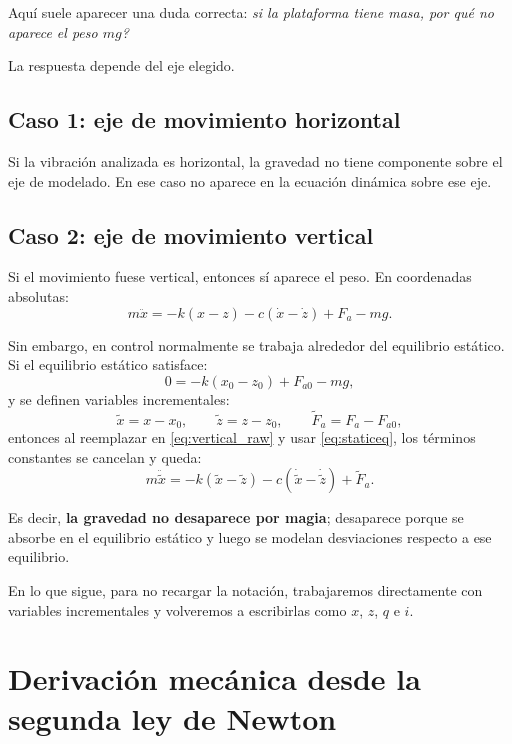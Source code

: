 \documentclass[11pt]{article}
\begin{document}
Aqu\'i suele aparecer una duda correcta: \textit{si la plataforma tiene masa, por qu\'e no aparece el peso $mg$?}

La respuesta depende del eje elegido.

\subsection{Caso 1: eje de movimiento horizontal}

Si la vibraci\'on analizada es horizontal, la gravedad no tiene componente sobre el eje de modelado. En ese caso no aparece en la ecuaci\'on din\'amica sobre ese eje.

\subsection{Caso 2: eje de movimiento vertical}

Si el movimiento fuese vertical, entonces s\'i aparece el peso. En coordenadas absolutas:
\begin{equation}
m\ddot x = -k(x-z) - c(\dot x-\dot z) + F_a - mg.
\label{eq:vertical_raw}
\end{equation}

Sin embargo, en control normalmente se trabaja alrededor del equilibrio est\'atico. Si el equilibrio est\'atico satisface:
\begin{equation}
0 = -k(x_0-z_0) + F_{a0} - mg,
\label{eq:staticeq}
\end{equation}
y se definen variables incrementales:
\[
\tilde x = x-x_0,\qquad
\tilde z = z-z_0,\qquad
\tilde F_a = F_a-F_{a0},
\]
entonces al reemplazar en \eqref{eq:vertical_raw} y usar \eqref{eq:staticeq}, los t\'erminos constantes se cancelan y queda:
\begin{equation}
m\ddot{\tilde x} = -k(\tilde x-\tilde z)-c(\dot{\tilde x}-\dot{\tilde z})+\tilde F_a.
\end{equation}

Es decir, \textbf{la gravedad no desaparece por magia}; desaparece porque se absorbe en el equilibrio est\'atico y luego se modelan desviaciones respecto a ese equilibrio.

En lo que sigue, para no recargar la notaci\'on, trabajaremos directamente con variables incrementales y volveremos a escribirlas como $x$, $z$, $q$ e $i$.

\section{Derivaci\'on mec\'anica desde la segunda ley de Newton}
\end{document}
